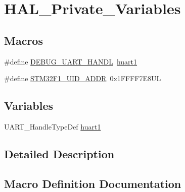 \hypertarget{group___h_a_l___private___variables}{}\section{H\+A\+L\+\_\+\+Private\+\_\+\+Variables}
\label{group___h_a_l___private___variables}
\subsection*{Macros}
\begin{DoxyCompactItemize}
\item 
\#define \mbox{\hyperlink{group___h_a_l___private___variables_ga6c05368ce95479087a767000d0825b24}{D\+E\+B\+U\+G\+\_\+\+U\+A\+R\+T\+\_\+\+H\+A\+N\+DL}}~\mbox{\hyperlink{group___h_a_l___private___variables_ga2cf715bef37f7e8ef385a30974a5f0d5}{huart1}}
\item 
\#define \mbox{\hyperlink{group___h_a_l___private___variables_gaadb0ad79eab01ba522b7d081c138760b}{S\+T\+M32\+F1\+\_\+\+U\+I\+D\+\_\+\+A\+D\+DR}}~0x1\+F\+F\+F\+F7\+E8\+UL
\end{DoxyCompactItemize}
\subsection*{Variables}
\begin{DoxyCompactItemize}
\item 
U\+A\+R\+T\+\_\+\+Handle\+Type\+Def \mbox{\hyperlink{group___h_a_l___private___variables_ga2cf715bef37f7e8ef385a30974a5f0d5}{huart1}}
\end{DoxyCompactItemize}


\subsection{Detailed Description}


\subsection{Macro Definition Documentation}
\mbox{\label{group___h_a_l___private___variables_ga6c05368ce95479087a767000d0825b24}} 
